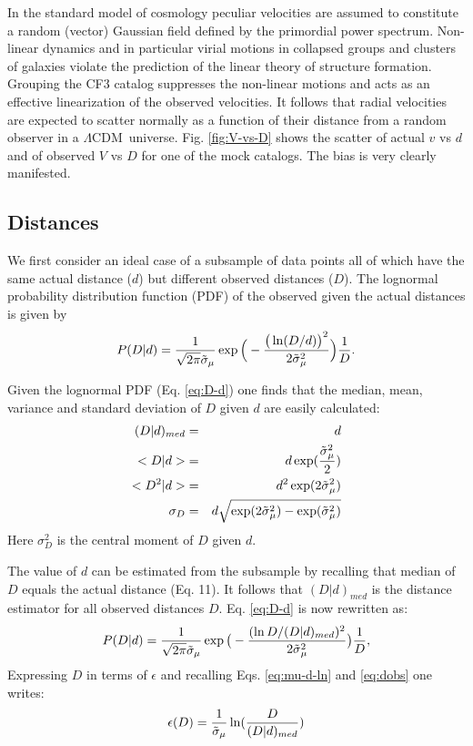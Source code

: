 \documentclass[useAMS,usenatbib]{mn2e}
\newcommand{\LCDM}{{$\Lambda$CDM}}
\begin{document}
In the standard model of cosmology peculiar velocities are assumed to constitute a random (vector) Gaussian field defined by the primordial power spectrum. Non-linear dynamics and in particular virial motions in collapsed groups and clusters of galaxies violate the prediction of the linear theory of structure formation. Grouping the CF3 catalog  suppresses the non-linear motions and acts as an effective linearization of the observed velocities. It follows that  radial velocities are expected to scatter normally as a function of their distance from a random observer in a \LCDM\ universe. Fig. \ref{fig:V-vs-D} shows the scatter of    actual   $v$ vs $d$ and of   observed  $V$ vs $D$ for one of the mock catalogs. The bias is very clearly manifested.




\subsection{Distances}%
\label{subsec:BGc-d}
We first consider an ideal case of a subsample of data points all of which have  the same actual distance ($d$) but   different observed distances ($D$). 
The lognormal  probability distribution function (PDF)  of the observed given the actual distances is given by
\begin{equation}
P(D\vert d)={1\over \sqrt{2\pi}\tilde{\sigma}_\mu} \exp\Big( - {\big(\ln(D/d)\big)^2\over 2 \tilde{\sigma}{_\mu^2}}   \Big) {1\over D}.
\label{eq:D-d}
\end{equation}


Given the lognormal PDF  (Eq. \ref{eq:D-d}) one finds that the median, mean, variance and standard deviation of $D$   given $d$ are easily calculated: 
\begin{eqnarray}
(D|d)_{med} & = &  d  \nonumber\\
< D|d > & = &  d \exp({\tilde{\sigma}{^2_\mu}\over 2} ) \nonumber\\
< D^2|d > & = &  d^2 \exp(2\tilde{\sigma}{^2_\mu} )                     \\
\sigma_D & = & d \sqrt{\exp(2\tilde{\sigma}{^2_\mu} )  - \exp(\tilde{\sigma}{^2_\mu}) } \nonumber
\label{eq:mean-D}
\end{eqnarray}
Here $\sigma{^2_D}$ is the central moment of  $D$ given $d$.

The  value of  $d$  can be estimated from the  subsample by  recalling  that median of $D$ equals the actual distance 
(Eq. 11). 
It follows that $(D|d)_{med} $ is the distance estimator for all observed distances $D$. Eq. \ref{eq:D-d} is now rewritten as:
\begin{equation}
P(D\vert d)={1\over \sqrt{2\pi}\tilde{\sigma}_\mu} \exp\big( -{(\ln{D/(D|d)_{med}})^2\over 2 \tilde{\sigma}{_\mu^2}}   \big) {1\over D},
\label{eq:D-Dmed}
\end{equation}
Expressing $D$ in terms of $\epsilon$  and recalling Eqs. \ref{eq:mu-d-ln} and  \ref{eq:dobs} one  writes:
\begin{equation}
\epsilon(D)={1\over\tilde{\sigma}_\mu}\ln({D\over  (D|d)_{med}})
\label{eq:epsilon-D}
\end{equation}
\end{document}
